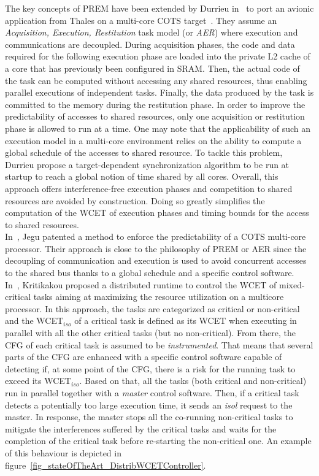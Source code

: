 \documentclass[main.tex]{subfiles}
\begin{document}
The key concepts of PREM have been extended by Durrieu \etal
in~\cite{Durrieu2014} to port an avionic application from Thales on a
multi-core COTS target~\cite{TMS320C6678}. They assume an \emph{Acquisition,
Execution, Restitution} task model (or \emph{AER}) where execution and
communications are decoupled. During acquisition phases, the code and data
required for the following execution phase are loaded into the private L2 cache
of a core that has previously been configured in SRAM. Then, the actual code of
the task can be computed without accessing any shared resources, thus enabling
parallel executions of independent tasks. Finally, the data produced by the
task is committed to the memory during the restitution phase. In order to
improve the predictability of accesses to shared resources, only one
acquisition or restitution phase is allowed to run at a time. One may note that
the applicability of such an execution model in a multi-core environment relies
on the ability to compute a global schedule of the accesses to shared resource.
To tackle this problem, Durrieu \etal propose a target-dependent
synchronization algorithm to be run at startup to reach a global notion of time
shared by all cores.  Overall, this approach offers interference-free execution
phases and competition to shared resources are avoided by construction. Doing
so greatly simplifies the computation of the WCET of execution phases and
timing bounds for the access to shared resources. \\

In~\cite{Jegu2012}, Jegu \etal patented a method to enforce the predictability
of a COTS multi-core processor. Their approach is close to the philosophy of
PREM or AER since the decoupling of communication and execution is used to
avoid concurrent accesses to the shared bus thanks to a global schedule and a
specific control software. \\

In~\cite{Kritikakou2014}, Kritikakou \etal proposed a distributed runtime to
control the WCET of mixed-critical tasks aiming at maximizing the resource
utilization on a multicore processor. In this approach, the tasks are
categorized as critical or non-critical and the WCET$_{iso}$ of a critical task
is defined as its WCET when executing in parallel with all the other critical
tasks (but no non-critical). From there, the CFG of each critical task is
assumed to be \emph{instrumented}. That means that several parts of the CFG are
enhanced with a specific control software capable of detecting if, at some
point of the CFG, there is a risk for the running task to exceed its
WCET$_{iso}$. Based on that, all the tasks (both critical and non-critical) run
in parallel together with a \emph{master} control software. Then, if a critical
task detects a potentially too large execution time, it sends an \emph{isol}
request to the master. In response, the master stops all the co-running
non-critical tasks to mitigate the interferences suffered by the critical tasks
and waits for the completion of the critical task before re-starting the
non-critical one. An example of this behaviour is depicted in
figure~\ref{fig_stateOfTheArt_DistribWCETController}. \\
\end{document}
